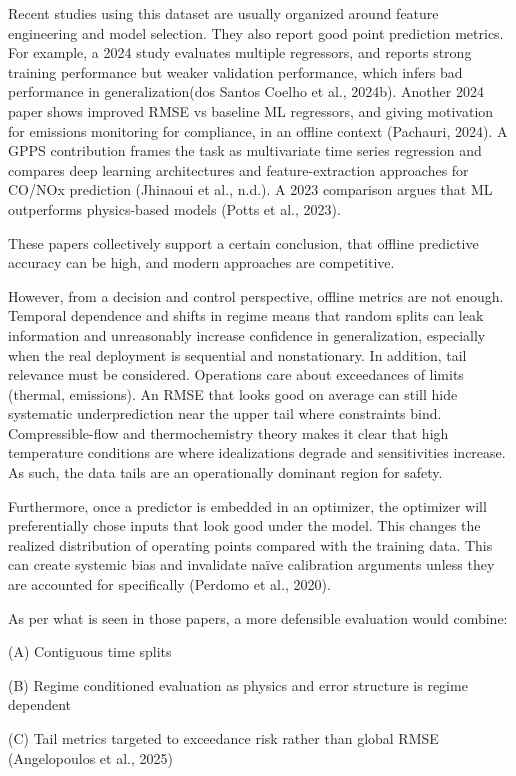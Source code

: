 \documentclass[11pt]{article}
\begin{document}
Recent studies using this dataset are usually organized around feature
engineering and model selection. They also report good point prediction
metrics. For example, a 2024 study evaluates multiple regressors, and
reports strong training performance but weaker validation performance,
which infers bad performance in generalization(dos Santos Coelho et al.,
2024b). Another 2024 paper shows improved RMSE vs baseline ML
regressors, and giving motivation for emissions monitoring for
compliance, in an offline context (Pachauri, 2024). A GPPS contribution
frames the task as multivariate time series regression and compares deep
learning architectures and feature-extraction approaches for CO/NOx
prediction (Jhinaoui et al., n.d.). A 2023 comparison argues that ML
outperforms physics-based models (Potts et al., 2023).

These papers collectively support a certain conclusion, that offline
predictive accuracy can be high, and modern approaches are competitive.

However, from a decision and control perspective, offline metrics are
not enough. Temporal dependence and shifts in regime means that random
splits can leak information and unreasonably increase confidence in
generalization, especially when the real deployment is sequential and
nonstationary. In addition, tail relevance must be considered.
Operations care about exceedances of limits (thermal, emissions). An
RMSE that looks good on average can still hide systematic
underprediction near the upper tail where constraints bind.
Compressible-flow and thermochemistry theory makes it clear that high
temperature conditions are where idealizations degrade and sensitivities
increase. As such, the data tails are an operationally dominant region
for safety.

Furthermore, once a predictor is embedded in an optimizer, the optimizer
will preferentially chose inputs that look good under the model. This
changes the realized distribution of operating points compared with the
training data. This can create systemic bias and invalidate naïve
calibration arguments unless they are accounted for specifically
(Perdomo et al., 2020).

As per what is seen in those papers, a more defensible evaluation would
combine:

(A) Contiguous time splits

(B) Regime conditioned evaluation as physics and error structure is
regime dependent

(C) Tail metrics targeted to exceedance risk rather than global RMSE
(Angelopoulos et al., 2025)
\end{document}
